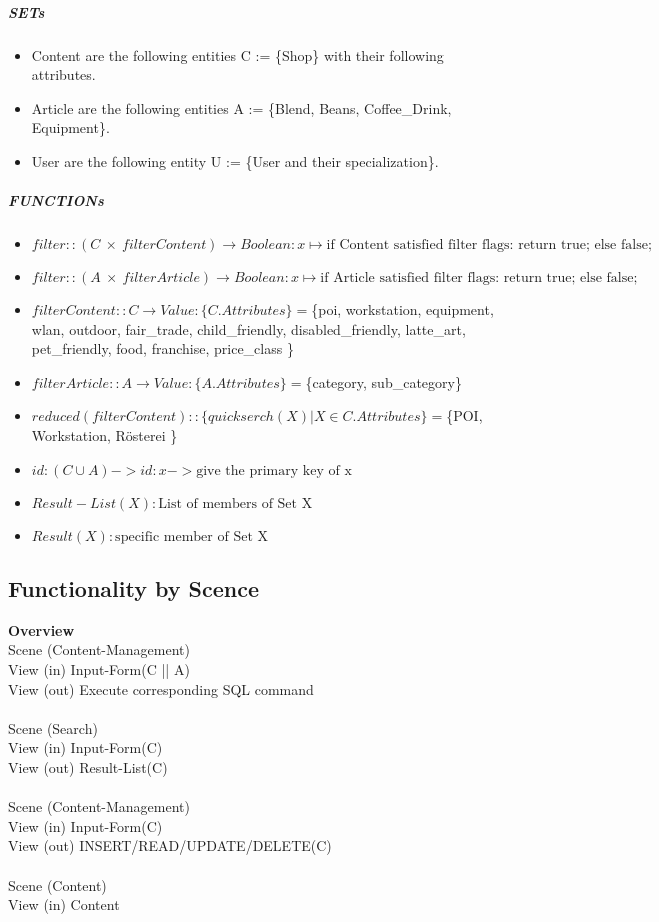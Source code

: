 \subparagraph{SETs}
\begin{itemize}
\item Content are the following entities C := \{Shop\} with their following attributes.
\item Article are the following entities A := \{Blend, Beans, Coffee\_Drink, Equipment\}.
\item User    are the following entity   U := \{User and their specialization\}.
\end{itemize}


\subparagraph{FUNCTIONs}
\begin{itemize}
\item $filter:: (C ~\times~ filterContent) \rightarrow Boolean: x \mapsto \textrm{if Content satisfied filter flags: return true; else false;}$
\item $filter:: (A ~\times~ filterArticle) \rightarrow Boolean: x \mapsto \textrm{if Article satisfied filter flags: return true; else false;}$
\item  $filterContent:: C \rightarrow Value: \{C.Attributes\} = $\{poi, workstation, equipment, wlan, outdoor, fair\_trade, child\_friendly, disabled\_friendly, latte\_art, pet\_friendly, food, franchise, price\_class \}
\item  $filterArticle:: A \rightarrow Value: \{A.Attributes\} = $\{category, sub\_category\} 
\item $reduced(filterContent):: \{quickserch(X) | X  \in C.Attributes\} = $\{POI, Workstation, Rösterei \}
\item $id: (C \cup A) -> id: x ->  \textrm{give the primary key of x}$
\item $Result-List(X): \textrm{List of members of Set X}$
\item $Result(X): \textrm{specific member of Set X}$
\end{itemize}



\subsection*{Functionality by Scence}
\textbf{Overview}\\
Scene (Content-Management)\\
View (in)   Input-Form(C || A)\\
View (out)  Execute corresponding SQL command\\
\\
Scene (Search)\\
View (in)   Input-Form(C)\\
View (out)  Result-List(C)\\
\\
Scene (Content-Management)\\
View (in)   Input-Form(C)\\
View (out)  INSERT/READ/UPDATE/DELETE(C)\\
\\
Scene (Content)\\
View (in)   Content\\
\\\\



